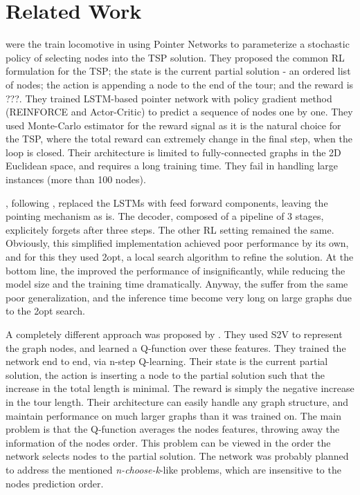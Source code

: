 \documentclass[10pt,a4paper,draft]{article}
\begin{document}
\section{Related Work}
\cite{bello16-tsp-pnac} were the train locomotive in using Pointer Networks to parameterize a stochastic policy of selecting nodes into the TSP solution. They proposed the common RL formulation for the TSP; the state is the current partial solution - an ordered list of nodes; the action is appending a node to the end of the tour; and the reward is ???. They trained LSTM-based pointer network with policy gradient method (REINFORCE and Actor-Critic) to predict a sequence of nodes one by one. They used Monte-Carlo estimator for the reward signal as it is the natural choice for the TSP, where the total reward can extremely change in the final step, when the loop is closed. Their architecture is limited to fully-connected graphs in the 2D Euclidean space, and requires a long training time. They fail in handling large instances (more than 100 nodes).

\cite{deudon18-tsp-nr2opt}, following \cite{bello16-tsp-pnac}, replaced the LSTMs with feed forward components, leaving the pointing mechanism as is. The decoder, composed of a pipeline of 3 stages, explicitely forgets after three steps. The other RL setting remained the same. Obviously, this simplified implementation achieved poor performance by its own, and for this they used 2opt, a local search algorithm to refine the solution. At the bottom line, the improved the performance of \cite{bello16-tsp-pnac} insignificantly, while reducing the model size and the training time dramatically. Anyway, the suffer from the same poor generalization, and the inference time become very long on large graphs due to the 2opt search.

A completely different approach was proposed by \cite{dai17-tsp-s2v}. They used S2V \cite{dai16-s2v} to represent the graph nodes, and learned a Q-function over these features. They trained the network end to end, via n-step Q-learning. Their state is the current partial solution, the action is inserting a node to the partial solution such that the increase in the total length is minimal. The reward is simply the negative increase in the tour length. Their architecture can easily handle any graph structure, and maintain performance on much larger graphs than it was trained on. The main problem is that the Q-function averages the nodes features, throwing away the information of the nodes order. This problem can be viewed in the order the network selects nodes to the partial solution. The network was probably planned to address the mentioned \textit{n-choose-k}-like problems, which are insensitive to the nodes prediction order.
\end{document}
